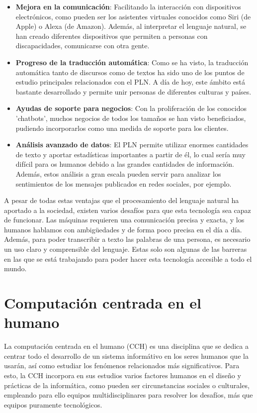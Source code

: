 \begin{itemize}
	\item \textbf{Mejora en la comunicación}: Facilitando la interacción con dispositivos electrónicos, como pueden ser los asistentes virtuales conocidos como Siri (de Apple) o Alexa (de Amazon). Además, al interpretar el lenguaje natural, se han creado diferentes dispositivos que permiten a personas con discapacidades, comunicarse con otra gente.
	
	\item \textbf{Progreso de la traducción automática}: Como se ha visto, la traducción automática tanto de discursos como de textos ha sido uno de los puntos de estudio principales relacionados con el PLN. A día de hoy, este ámbito está bastante desarrollado y permite unir personas de diferentes culturas y países.
	
	\item \textbf{Ayudas de soporte para negocios}: Con la proliferación de los conocidos 'chatbots', muchos negocios de todos los tamaños se han visto beneficiados, pudiendo incorporarlos como una medida de soporte para los clientes.
	
	\item \textbf{Análisis avanzado de datos}: El PLN permite utilizar enormes cantidades de texto y aportar estadísticas importantes a partir de él, lo cual sería muy difícil para os humanos debido a las grandes cantidades de información. Además, estos análisis a gran escala pueden servir para analizar los sentimientos de los mensajes publicados en redes sociales, por ejemplo.
\end{itemize}

A pesar de todas estas ventajas que el procesamiento del lenguaje natural ha aportado a la sociedad, existen varios desafíos para que esta tecnología sea capaz de funcionar. Las máquinas requieren una comunicación precisa y exacta, y los humanos hablamos con ambigüedades y de forma poco precisa en el día a día. Además, para poder transcribir a texto las palabras de una persona, es necesario un uso claro y comprensible del lenguaje. Estas solo son algunas de las barreras en las que se está trabajando para poder hacer esta tecnología accesible a todo el mundo.


\section{Computación centrada en el humano}

La computación centrada en el humano (CCH) es una disciplina que se dedica a  centrar todo el desarrollo de un sistema informátivo en los seres humanos que la usarán, así como estudiar los fenómenos relacionados más significativos. Para esto, la CCH incorpora en sus estudios varios factores humanos en el diseño y prácticas de la informática, como pueden ser circunstancias sociales o culturales, empleando para ello equipos multidisciplinares para resolver los desafíos, más que equipos puramente tecnológicos.

